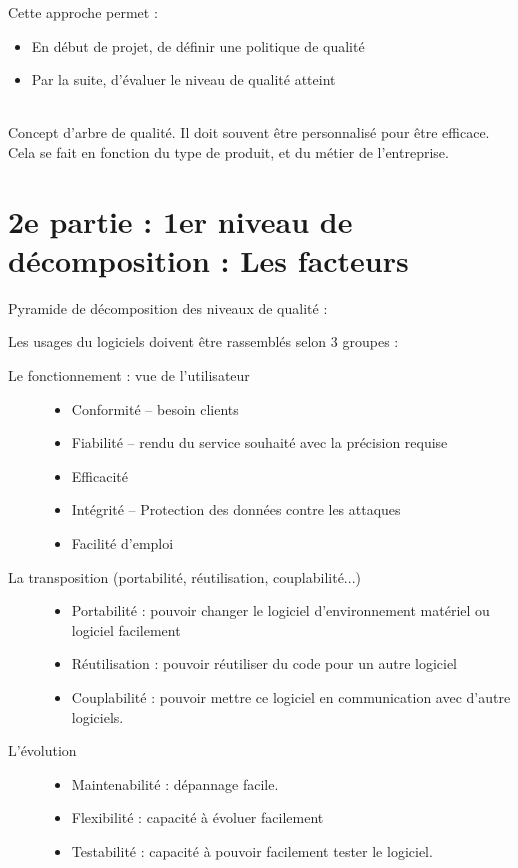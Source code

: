 \hfill

Cette approche permet :
\begin{itemize}
\item En début de projet, de définir 	une politique de qualité
\item Par la suite, d'évaluer le niveau de qualité atteint
\end{itemize}

\hfill\\

Concept d'arbre de qualité. Il doit souvent être personnalisé pour être efficace. Cela se fait en fonction du type de produit, et du métier de l’entreprise.	 	 	 	

\section{2e partie : 1er niveau de décomposition : Les facteurs}

	 	 	 	
Pyramide de décomposition des niveaux de qualité :


Les usages du logiciels doivent être rassemblés selon 3 groupes :
\begin{description}
\item[Le fonctionnement : vue de l'utilisateur]
	\begin{itemize}
	\item Conformité – besoin clients
	\item Fiabilité – rendu du service souhaité avec la précision requise
	\item Efficacité
	\item Intégrité – Protection des données contre les attaques
	\item Facilité d'emploi
	\end{itemize}
\item[La transposition (portabilité, 	réutilisation, couplabilité...)]
	\begin{itemize}
	\item Portabilité : pouvoir changer le logiciel d'environnement matériel ou logiciel facilement
	\item Réutilisation : pouvoir	réutiliser du code pour un autre logiciel
	\item Couplabilité : pouvoir mettre ce logiciel en communication avec d'autre logiciels.
	\end{itemize}
\item[L'évolution]
	\begin{itemize}
	\item Maintenabilité : dépannage facile.
	\item Flexibilité : capacité à 	évoluer facilement
	\item Testabilité : capacité à pouvoir facilement tester le logiciel.
	\end{itemize}
\end{description}


